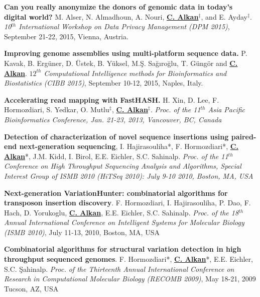 \documentclass[margin,line]{res}
\newcommand{\calkan}{{\bf {\underline{C. Alkan}}}}
\begin{document}
\begin{resume}
\vspace{-.2cm}
{\bf Can you really anonymize the donors of genomic data in today's digital world?}
M. Alser, N. Almadhoun, A. Nouri, {\bf {\underline{C. Alkan}}}$^\ddag$, and E. Ayday$^\ddag$. 
{\em 10$^{th}$ International Workshop on Data Privacy Management (DPM 2015)}, 
 September 21-22, 2015, Vienna, Austria.

\vspace{-.2cm}

{\bf Improving genome assemblies using multi-platform sequence data.}
P. Kavak, B. Ergüner, D. Üstek, B. Yüksel, M.Ş. Sağıroğlu, T. Güngör and \calkan{}.
{\em $12^{th}$ Computational Intelligence methods for Bioinformatics and Biostatistics (CIBB 2015)}, 
 September 10-12, 2015, Naples, Italy.

\vspace{-.2cm}
{\bf Accelerating read mapping with FastHASH.}
H. Xin, D. Lee, F. Hormozdiari, S. Yedkar, O. Mutlu$^\ddag$, {\bf {\underline {C. Alkan}}}$^\ddag$.
{\em  Proc. of the 11$^{th}$  Asia Pacific Bioinformatics Conference,
Jan. 21-23, 2013, Vancouver, BC, Canada}

\vspace{-.2cm}
{\bf Detection of characterization of novel sequence insertions using paired-end next-generation sequencing},
 I. Hajirasouliha*, F. Hormozdiari*, {\bf {\underline{C. Alkan}}}*, J.M. Kidd, I. Birol, E.E. Eichler,
 S.C. Sahinalp.
{\em  Proc. of the 11$^{th}$  Conference on High Throughput Sequencing Analysis and Algorithms, Special Interest
Group of ISMB 2010 (HiTSeq 2010): July 9-10 2010, Boston, MA, USA}

\vspace{-.2cm}
{\bf Next-generation VariationHunter: combinatorial algorithms for transposon insertion discovery}.
F. Hormozdiari, I. Hajirasouliha, P. Dao, F. Hach, D. Yorukoglu, {\bf {\underline{C. Alkan}}},
 E.E. Eichler, S.C. Sahinalp.
{\em Proc. of the 18$^{th}$ Annual International Conference on Intelligent Systems
for Molecular Biology (ISMB 2010)}, July 11-13, 2010, Boston, MA, USA



\vspace{-.2cm}
{\bf  Combinatorial algorithms for structural variation detection in high throughput sequenced genomes}.
F. Hormozdiari*, {\bf {\underline{C. Alkan}}}*, E.E. Eichler, S.C. \c{S}ahinalp.
{\em Proc. of the
 Thirteenth Annual International Conference on Research in Computational Molecular 
Biology (RECOMB 2009)}, May 18-21, 2009 Tucson, AZ, USA


\end{resume}
\end{document}
